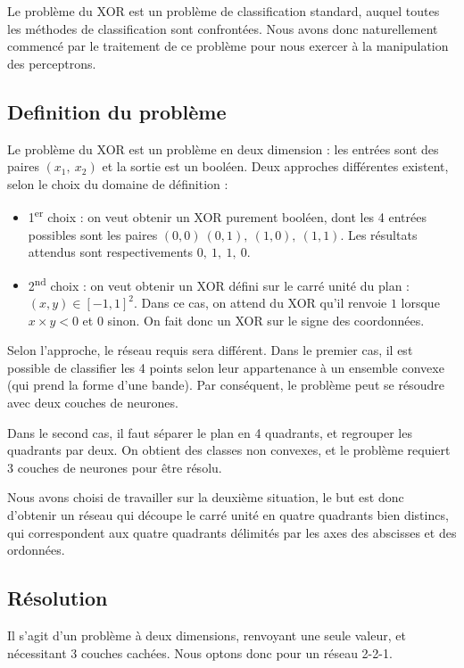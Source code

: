 Le problème du XOR est un problème de classification standard, auquel toutes les méthodes de classification sont confrontées. Nous avons donc naturellement commencé par le traitement de ce problème pour nous exercer à la manipulation des perceptrons.

\subsection{Definition du problème}

Le problème du XOR est un problème en deux dimension : les entrées sont des paires $(x_1,\ x_2)$ et la sortie est un booléen. Deux approches différentes existent, selon le choix du domaine de définition : 

\begin{itemize}
  \item 1\textsuperscript{er} choix : on veut obtenir un XOR purement booléen, dont les 4 entrées possibles sont les paires $(0,0)\ (0,1),\ (1,0),\ (1,1)$. Les résultats attendus sont respectivements $0,\ 1,\ 1,\ 0$.
  \item 2\textsuperscript{nd} choix : on veut obtenir un XOR défini sur le carré unité du plan : ${(x,y) \in [-1,1]^2}$. Dans ce cas, on attend du XOR qu'il renvoie $1$ lorsque $x \times y < 0$ et $0$ sinon. On fait donc un XOR sur le signe des coordonnées.
\end{itemize}

Selon l'approche, le réseau requis sera différent. Dans le premier cas, il est possible de classifier les 4 points selon leur appartenance à un ensemble convexe (qui prend la forme d'une bande). Par conséquent, le problème peut se résoudre avec deux couches de neurones.

Dans le second cas, il faut séparer le plan en 4 quadrants, et regrouper les quadrants par deux. On obtient des classes non convexes, et le problème requiert 3 couches de neurones pour être résolu.

Nous avons choisi de travailler sur la deuxième situation, le but est donc d'obtenir un réseau qui découpe le carré unité en quatre quadrants bien distincs, qui correspondent aux quatre quadrants délimités par les axes des abscisses et des ordonnées.

\subsection{Résolution}

Il s'agit d'un problème à deux dimensions, renvoyant une seule valeur, et nécessitant 3 couches cachées. Nous optons donc pour un réseau 2-2-1. 

